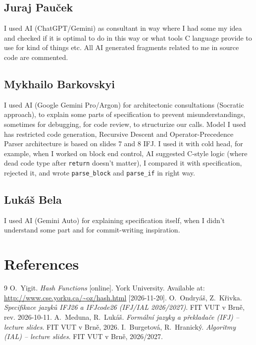 \documentclass[12pt,a4paper]{article}
\begin{document}
\subsection{Juraj Pauček}

I used AI (ChatGPT/Gemini) as consultant in way where I had some my idea and checked if it is optimal to do in this way or what tools C language provide to use for kind of things etc. All AI generated fragments related to me in source code are commented.

\subsection{Mykhailo Barkovskyi}

I used AI (Google Gemini Pro/Argon) for architectonic consultations (Socratic approach), to explain some parts of specification to prevent misunderstandings, sometimes for debugging, for code review, to structurize our calls. Model I used has restricted code generation, Recursive Descent and Operator-Precedence Parser architecture is based on slides 7 and 8 IFJ. I used it with cold head, for example, when I worked on block end control, AI suggested C-style logic (where dead code type after \texttt{return} doesn't matter), I compared it with specification, rejected it, and wrote \texttt{parse\_block} and \texttt{parse\_if} in right way.

\subsection{Lukáš Bela}

I used AI (Gemini Auto) for explaining specification itself, when I didn't understand some part and for commit-writing inspiration.

\section{References}
\begin{thebibliography}{9}
  O.~Yigit. \emph{Hash Functions} [online]. York University.
  Available at: \url{http://www.cse.yorku.ca/~oz/hash.html} [2026-11-20].
  O.~Ondryáš, Z.~Křivka. \emph{Specifikace jazyků IFJ26 a IFJcode26 (IFJ/IAL 2026/2027)}. FIT VUT v Brně, rev. 2026-10-11.
  A.~Meduna, R.~Lukáš. \emph{Formální jazyky a překladače (IFJ) -- lecture slides}. FIT VUT v Brně, 2026.
  I.~Burgetová, R.~Hranický. \emph{Algoritmy (IAL) -- lecture slides}. FIT VUT v Brně, 2026/2027.
\end{thebibliography}
\end{document}
